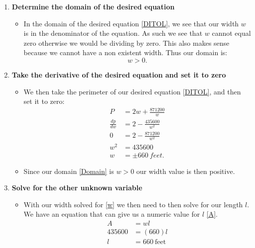 \documentclass[12pt]{article}
\begin{document}
\begin{enumerate}
  \item \textbf{Determine the domain of the desired equation}
    \begin{itemize}
      \item In the domain of the desired equation \eqref{DITOL}, we see that our width $w$ is in the denominator of the equation. As such we see that $w$ cannot equal zero otherwise we would be dividing by zero. This also makes sense because we cannot have a non existent width. Thus our domain is:
      \begin{equation}
        w > 0. \tag{Domain} \label{Domain}
      \end{equation}
    \end{itemize}
\newpage
  \item \textbf{Take the derivative of the desired equation and set it to zero}
    \begin{itemize}
      \item We then take the perimeter of our desired equation \eqref{DITOL}, and then set it to zero:
      \begin{equation}
        \begin{split}
          P &= 2w + \frac{871200}{w}\\
          \frac{dp}{dw} &= 2 - \frac{435600}{w^2}\\
          0 &= 2 - \frac{871200}{w^2}\\
          w^2 &= 435600\\
          w &= \pm 660\ {feet}.
        \end{split}
        \tag{Width Value} \label{w}
      \end{equation}
      \item Since our domain \eqref{Domain} is $w > 0$ our width value is then positive.
    \end{itemize}
  \item \textbf{Solve for the other unknown variable}
    \begin{itemize}
      \item With our width solved for \eqref{w} we then need to then solve for our length $l$. We have an equation that can give us a numeric value for $l$ \eqref{A}.
      \begin{equation}
        \begin{split}
          A &= wl\\
          435600 &= (660) l\\
          l &= 660\ \text{feet}
        \end{split}
        \tag {Length} \tag{l}

\end{equation}
\end{itemize}
\end{enumerate}
\end{document}
